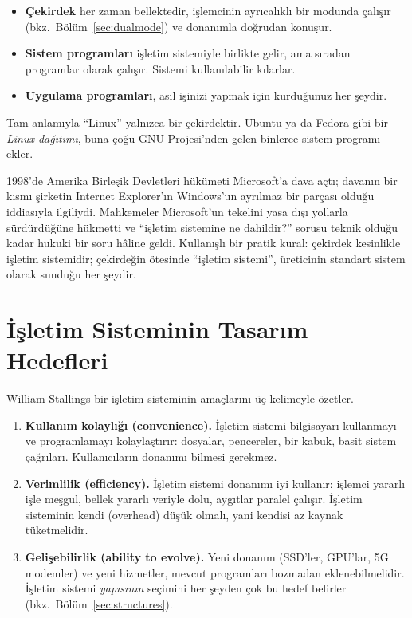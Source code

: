 \begin{itemize}
  \item \textbf{Çekirdek} her zaman bellektedir, işlemcinin ayrıcalıklı bir modunda çalışır (bkz.\ Bölüm~\ref{sec:dualmode}) ve donanımla doğrudan konuşur.
  \item \textbf{Sistem programları} işletim sistemiyle birlikte gelir, ama sıradan programlar olarak çalışır. Sistemi kullanılabilir kılarlar.
  \item \textbf{Uygulama programları}, asıl işinizi yapmak için kurduğunuz her şeydir.
\end{itemize}

Tam anlamıyla ``Linux'' yalnızca bir çekirdektir. Ubuntu ya da Fedora gibi bir \emph{Linux dağıtımı}, buna çoğu GNU Projesi'nden gelen binlerce sistem programı ekler.

\begin{histnote}
1998'de Amerika Birleşik Devletleri hükümeti Microsoft'a dava açtı; davanın bir kısmı şirketin Internet Explorer'ın Windows'un ayrılmaz bir parçası olduğu iddiasıyla ilgiliydi. Mahkemeler Microsoft'un tekelini yasa dışı yollarla sürdürdüğüne hükmetti ve ``işletim sistemine ne dahildir?'' sorusu teknik olduğu kadar hukuki bir soru hâline geldi. Kullanışlı bir pratik kural: çekirdek kesinlikle işletim sistemidir; çekirdeğin ötesinde ``işletim sistemi'', üreticinin standart sistem olarak sunduğu her şeydir.
\end{histnote}

\section{İşletim Sisteminin Tasarım Hedefleri}

William Stallings bir işletim sisteminin amaçlarını üç kelimeyle özetler.

\begin{enumerate}[leftmargin=1.4em]
  \item \textbf{Kullanım kolaylığı (convenience).} İşletim sistemi bilgisayarı kullanmayı ve programlamayı kolaylaştırır: dosyalar, pencereler, bir kabuk, basit sistem çağrıları. Kullanıcıların donanımı bilmesi gerekmez.
  \item \textbf{Verimlilik (efficiency).} İşletim sistemi donanımı iyi kullanır: işlemci yararlı işle meşgul, bellek yararlı veriyle dolu, aygıtlar paralel çalışır. İşletim sisteminin kendi  (overhead) düşük olmalı, yani kendisi az kaynak tüketmelidir.
  \item \textbf{Gelişebilirlik (ability to evolve).} Yeni donanım (SSD'ler, GPU'lar, 5G modemler) ve yeni hizmetler, mevcut programları bozmadan eklenebilmelidir. İşletim sistemi \emph{yapısının} seçimini her şeyden çok bu hedef belirler (bkz.\ Bölüm~\ref{sec:structures}).
\end{enumerate}

